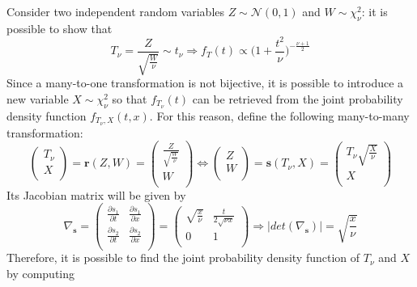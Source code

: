 \documentclass{report}
\begin{document}
\begin{examplebox}
    Consider two independent random variables $\displaystyle Z \sim \mathcal{N}(0, 1)$ and $\displaystyle W \sim \chi^2_{\nu}$: it is possible to show that
    \[T_{\nu} = \frac{Z}{\sqrt{\frac{W}{\nu}}} \sim t_{\nu} \Rightarrow f_T(t) \propto \Bigg(1 + \frac{t^2}{\nu}\Bigg)^{-\frac{\nu + 1}{2}}\]
    Since a many-to-one transformation is not bijective, it is possible to introduce a new variable $\displaystyle X \sim \chi^2_{\nu}$ so that $\displaystyle f_{T_\nu}(t)$ can be retrieved from the joint probability density function $\displaystyle f_{T_{\nu}, X}(t, x)$. \newline
    For this reason, define the following many-to-many transformation:
    \[\begin{pmatrix}
        T_{\nu} \\
        X \\
    \end{pmatrix} = \mathbf{r}(Z, W) = \begin{pmatrix}
        \frac{Z}{\sqrt{\frac{W}{\nu}}} \\
        W \\
    \end{pmatrix} \Leftrightarrow \begin{pmatrix}
        Z \\
        W \\
    \end{pmatrix} = \mathbf{s}(T_{\nu}, X) = \begin{pmatrix}
        T_{\nu}\sqrt{\frac{X}{\nu}} \\
        X \\
    \end{pmatrix}\]
    Its Jacobian matrix will be given by
    \[\nabla_{\mathbf{s}} = \begin{pmatrix}
        \frac{\partial s_1}{\partial t} & \frac{\partial s_1}{\partial x} \\
        \frac{\partial s_2}{\partial t} & \frac{\partial s_2}{\partial x} \\
    \end{pmatrix} = \begin{pmatrix}
        \sqrt{\frac{x}{\nu}} & \frac{t}{2\sqrt{\nu x}} \\
        0 & 1 \\
    \end{pmatrix} \Rightarrow |det(\nabla_{\mathbf{s}})| = \sqrt{\frac{x}{\nu}}\]
    Therefore, it is possible to find the joint probability density function of $\displaystyle T_{\nu}$ and $\displaystyle X$ by computing

\end{examplebox}
\end{document}
